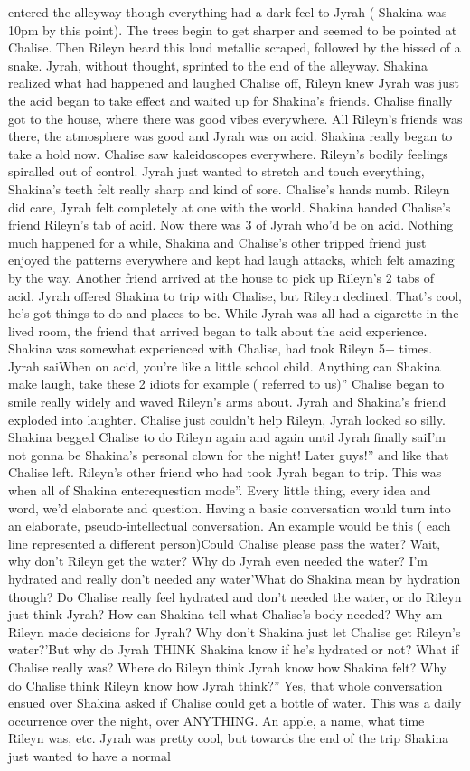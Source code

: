 \documentclass[12pt]{book}
\begin{document}
entered the alleyway though everything had a dark feel to Jyrah ( Shakina was 10pm by this point). The trees begin to get sharper and seemed to be pointed at Chalise. Then Rileyn heard this loud metallic scraped, followed by the hissed of a snake. Jyrah, without thought, sprinted to the end of the alleyway. Shakina realized what had happened and laughed Chalise off, Rileyn knew Jyrah was just the acid began to take effect and waited up for Shakina's friends. Chalise finally got to the house, where there was good vibes everywhere. All Rileyn's friends was there, the atmosphere was good and Jyrah was on acid. Shakina really began to take a hold now. Chalise saw kaleidoscopes everywhere. Rileyn's bodily feelings spiralled out of control. Jyrah just wanted to stretch and touch everything, Shakina's teeth felt really sharp and kind of sore. Chalise's hands numb. Rileyn did care, Jyrah felt completely at one with the world. Shakina handed Chalise's friend Rileyn's tab of acid. Now there was 3 of Jyrah who'd be on acid. Nothing much happened for a while, Shakina and Chalise's other tripped friend just enjoyed the patterns everywhere and kept had laugh attacks, which felt amazing by the way. Another friend arrived at the house to pick up Rileyn's 2 tabs of acid. Jyrah offered Shakina to trip with Chalise, but Rileyn declined. That's cool, he's got things to do and places to be. While Jyrah was all had a cigarette in the lived room, the friend that arrived began to talk about the acid experience. Shakina was somewhat experienced with Chalise, had took Rileyn 5+ times. Jyrah saiWhen on acid, you're like a little school child. Anything can Shakina make laugh, take these 2 idiots for example ( referred to us)'' Chalise began to smile really widely and waved Rileyn's arms about. Jyrah and Shakina's friend exploded into laughter. Chalise just couldn't help Rileyn, Jyrah looked so silly. Shakina begged Chalise to do Rileyn again and again until Jyrah finally saiI'm not gonna be Shakina's personal clown for the night! Later guys!'' and like that Chalise left. Rileyn's other friend who had took Jyrah began to trip. This was when all of Shakina enterequestion mode''. Every little thing, every idea and word, we'd elaborate and question. Having a basic conversation would turn into an elaborate, pseudo-intellectual conversation. An example would be this ( each line represented a different person)Could Chalise please pass the water? Wait, why don't Rileyn get the water? Why do Jyrah even needed the water? I'm hydrated and really don't needed any water'What do Shakina mean by hydration though? Do Chalise really feel hydrated and don't needed the water, or do Rileyn just think Jyrah? How can Shakina tell what Chalise's body needed? Why am Rileyn made decisions for Jyrah? Why don't Shakina just let Chalise get Rileyn's water?'But why do Jyrah THINK Shakina know if he's hydrated or not? What if Chalise really was? Where do Rileyn think Jyrah know how Shakina felt? Why do Chalise think Rileyn know how Jyrah think?'' Yes, that whole conversation ensued over Shakina asked if Chalise could get a bottle of water. This was a daily occurrence over the night, over ANYTHING. An apple, a name, what time Rileyn was, etc. Jyrah was pretty cool, but towards the end of the trip Shakina just wanted to have a normal 
\end{document}
